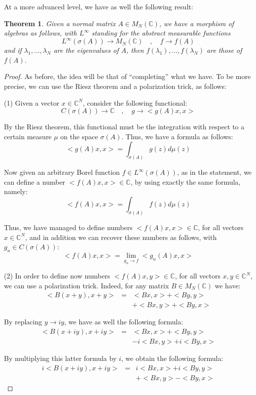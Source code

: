 \documentclass[12pt]{amsbook}
\newtheorem{theorem}{Theorem}[chapter]
\begin{document}
At a more advanced level, we have as well the following result:

\begin{theorem}
Given a normal matrix $A\in M_N(\mathbb C)$, we have a morphism of algebras as follows, with $L^\infty$ standing for the abstract measurable functions
$$L^\infty(\sigma(A))\to M_N(\mathbb C)\quad,\quad 
f\to f(A)$$
and if $\lambda_1,\ldots,\lambda_N$ are the eigenvalues of $A$, then $f(\lambda_1),\ldots,f(\lambda_N)$ are those of $f(A)$.
\end{theorem}

\begin{proof}
As before, the idea will be that of ``completing'' what we have. To be more precise, we can use the Riesz theorem and a polarization trick, as follows:

\medskip

(1) Given a vector $x\in\mathbb C^N$, consider the following functional:
$$C(\sigma(A))\to\mathbb C\quad,\quad 
g\to<g(A)x,x>$$

By the Riesz theorem, this functional must be the integration with respect to a certain measure $\mu$ on the space $\sigma(A)$. Thus, we have a formula as follows:
$$<g(A)x,x>=\int_{\sigma(A)}g(z)d\mu(z)$$

Now given an arbitrary Borel function $f\in L^\infty(\sigma(A))$, as in the statement, we can define a number $<f(A)x,x>\in\mathbb C$, by using exactly the same formula, namely:
$$<f(A)x,x>=\int_{\sigma(A)}f(z)d\mu(z)$$

Thus, we have managed to define numbers $<f(A)x,x>\in\mathbb C$, for all vectors $x\in\mathbb C^N$, and in addition we can recover these numbers as follows, with $g_n\in C(\sigma(A))$:
$$<f(A)x,x>=\lim_{g_n\to f}<g_n(A)x,x>$$ 

(2) In order to define now numbers $<f(A)x,y>\in\mathbb C$, for all vectors $x,y\in\mathbb C^N$, we can use a polarization trick. Indeed, for any matrix $B\in M_N(\mathbb C)$ we have:
\begin{eqnarray*}
<B(x+y),x+y>
&=&<Bx,x>+<By,y>\\
&&+<Bx,y>+<By,x>
\end{eqnarray*}

By replacing $y\to iy$, we have as well the following formula:
\begin{eqnarray*}
<B(x+iy),x+iy>
&=&<Bx,x>+<By,y>\\
&&-i<Bx,y>+i<By,x>
\end{eqnarray*}

By multiplying this latter formula by $i$, we obtain the following formula:
\begin{eqnarray*}
i<B(x+iy),x+iy>
&=&i<Bx,x>+i<By,y>\\
&&+<Bx,y>-<By,x>
\end{eqnarray*}


\end{proof}
\end{document}
